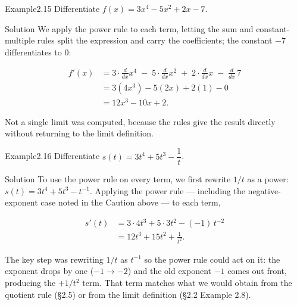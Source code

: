 \documentclass[a4paper,12pt,oneside]{memoir}
\begin{document}
\begin{workedexample}
\begin{envexample}{Example}{2.15}{}
Differentiate \(f(x) = 3x^{4} - 5x^{2} + 2x - 7\).
\end{envexample}
\begin{envsolution}{Solution}{}{}
We apply the power rule to each term, letting the sum and constant-multiple rules split the expression and carry the coefficients; the constant \(-7\) differentiates to \(0\):

\[ \begin{aligned}
          f'(x) &= 3\cdot\frac{d}{dx}x^{4} \;-\; 5\cdot\frac{d}{dx}x^{2} \;+\; 2\cdot\frac{d}{dx}x \;-\; \frac{d}{dx}\,7 \\[2pt]
                &= 3(4x^{3}) - 5(2x) + 2(1) - 0 \\[2pt]
                &= 12x^{3} - 10x + 2.
        \end{aligned} \]

Not a single limit was computed, because the rules give the result directly without returning to the limit definition.
\end{envsolution}
\end{workedexample}
\begin{workedexample}
\begin{envexample}{Example}{2.16}{}
Differentiate \(s(t) = 3t^{4} + 5t^{3} - \dfrac{1}{t}\).
\end{envexample}
\begin{envsolution}{Solution}{}{}
To use the power rule on every term, we first rewrite \(1/t\) as a power: \(s(t) = 3t^{4} + 5t^{3} - t^{-1}\). Applying the power rule — including the negative-exponent case noted in the Caution above — to each term,

\[ \begin{aligned}
          s'(t) &= 3 \cdot 4t^{3} + 5 \cdot 3t^{2} - (-1)\,t^{-2} \\[2pt]
                &= 12t^{3} + 15t^{2} + \frac{1}{t^{2}}.
        \end{aligned} \]

The key step was rewriting \(1/t\) as \(t^{-1}\) so the power rule could act on it: the exponent drops by one (\(-1 \to -2\)) and the old exponent \(-1\) comes out front, producing the \(+1/t^{2}\) term. That term matches what we would obtain from the quotient rule (§2.5) or from the limit definition (§2.2 Example 2.8).
\end{envsolution}
\end{workedexample}
\end{document}
